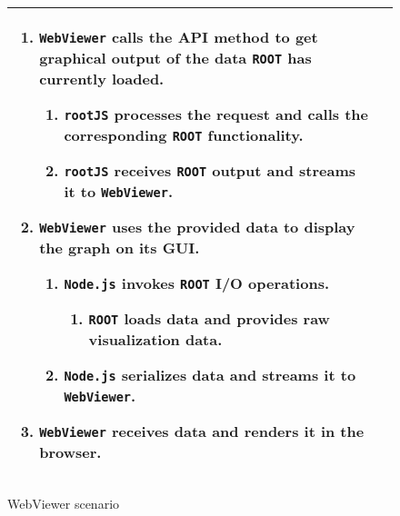 \begin{figure}[htb]
\begin{longtable}{p{3cm} @{\hskip 1cm} p{12cm}}
\begin{enumerate}
			\item \texttt{WebViewer} calls the API method to get graphical output of the data \texttt{ROOT} has currently loaded.
				\begin{enumerate}
					\item \texttt{rootJS} processes the request and calls the corresponding \texttt{ROOT} functionality.
					\item \texttt{rootJS} receives \texttt{ROOT} output and streams it to \texttt{WebViewer}.
				\end{enumerate}
			\item \texttt{WebViewer} uses the provided data to display the graph on its GUI.
				\begin{enumerate}
					\item \texttt{Node.js} invokes \texttt{ROOT} I/O operations.
						\begin{enumerate}
							\item \texttt{ROOT} loads data and provides raw visualization data.
						\end{enumerate}
					\item \texttt{Node.js} serializes data and streams it to \texttt{WebViewer}.
				\end{enumerate}
			\item \texttt{WebViewer} receives data and renders it in the browser.
		\end{enumerate}
		\\
		\hline
		
	\end{longtable}
	
	\caption{WebViewer scenario}
	
\end{figure}

\pagebreak[4]

